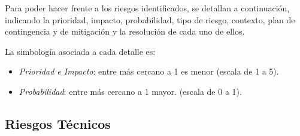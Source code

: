 Para poder hacer frente a los riesgos identificados, se detallan a continuaci\'on, indicando la prioridad, impacto, probabilidad, tipo de riesgo, contexto, plan de contingencia y de mitigaci\'on y la resoluci\'on de cada uno de ellos.

La simbolog\'ia asociada a cada detalle es:

\begin{itemize}
\item \emph{Prioridad e Impacto}: entre m\'as cercano a 1 es menor (escala de  1 a  5). 
\item \emph{Probabilidad}: entre m\'as cercano a 1 mayor. (escala de 0 a 1).
\end{itemize}

\subsection{Riesgos T\'ecnicos}

